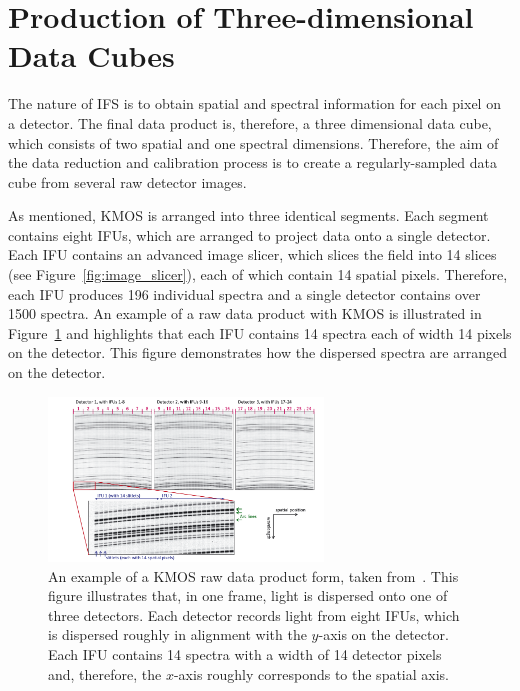 
\section{Production of Three-dimensional Data Cubes} %
\label{sec:3Ddata}

The nature of IFS is to obtain spatial and spectral information for each pixel on a detector.
The final data product is, therefore, a three dimensional data cube, which consists of two spatial and one spectral dimensions.
Therefore, the aim of the data reduction and calibration process is to create a regularly-sampled data cube from several raw detector images.

As mentioned, KMOS is arranged into three identical segments.
Each segment contains eight IFUs, which are arranged to project data onto a single detector.
Each IFU contains an advanced image slicer, which slices the field into 14 slices (see Figure~\ref{fig:image_slicer}), each of which contain 14 spatial pixels.
Therefore, each IFU produces 196 individual spectra and a single detector contains over 1500 spectra.
An example of a raw data product with KMOS is illustrated in Figure~\ref{fig:kmosdata} and highlights that each IFU contains 14 spectra each of width 14 pixels on the detector.
This figure demonstrates how the dispersed spectra are arranged on the detector.

\begin{figure}
 \centering
 \includegraphics[width=0.65\textwidth]{kmos/kmos-data-Davies13}
 \caption[An example of KMOS raw data]{An example of a KMOS raw data product form, taken from~\citet{2013A&A...558A..56D}.
 This figure illustrates that, in one frame, light is dispersed onto one of three detectors.
 Each detector records light from eight IFUs,
 which is dispersed roughly in alignment with the $y$-axis on the detector.
 Each IFU contains 14 spectra with a width of 14 detector pixels and, therefore, the $x$-axis roughly corresponds to the spatial axis.
 \label{fig:kmosdata}}
\end{figure}

